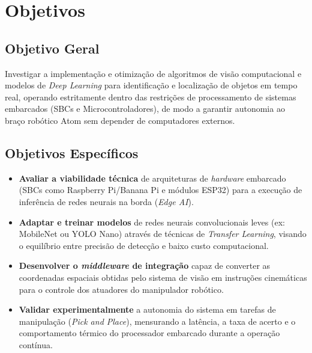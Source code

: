 \section*{Objetivos}


\subsection*{Objetivo Geral}

Investigar a implementação e otimização de algoritmos de visão computacional e modelos de \textit{Deep Learning} para identificação e localização de objetos em tempo real, operando estritamente dentro das restrições de processamento de sistemas embarcados (SBCs e Microcontroladores), de modo a garantir autonomia ao braço robótico Atom sem depender de computadores externos.

\subsection*{Objetivos Específicos}

\begin{itemize} 
  \item \textbf{Avaliar a viabilidade técnica} de arquiteturas de \textit{hardware} embarcado (SBCs como Raspberry Pi/Banana Pi e módulos ESP32) para a execução de inferência de redes neurais na borda (\textit{Edge AI}).
  \item \textbf{Adaptar e treinar modelos} de redes neurais convolucionais leves (ex: MobileNet ou YOLO Nano) através de técnicas de \textit{Transfer Learning}, visando o equilíbrio entre precisão de detecção e baixo custo computacional.

  \item \textbf{Desenvolver o \textit{middleware} de integração} capaz de converter as coordenadas espaciais obtidas pelo sistema de visão em instruções cinemáticas para o controle dos atuadores do manipulador robótico.

  \item \textbf{Validar experimentalmente} a autonomia do sistema em tarefas de manipulação (\textit{Pick and Place}), mensurando a latência, a taxa de acerto e o comportamento térmico do processador embarcado durante a operação contínua.
\end{itemize}